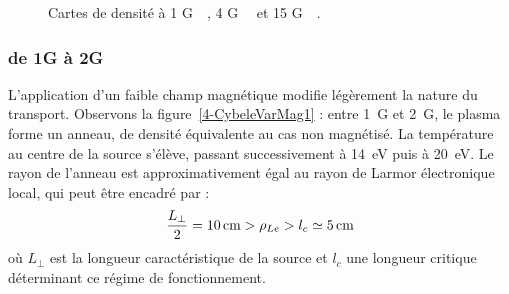 \begin{refsection}
\begin{figure}[!htb]
  \centering
    \caption{Cartes de densité à 1 G~~, 4
    G~~ et 15 G~~.}
    \label{4-CybeleVarMag-1}
\end{figure}

\subsubsection{de 1G à 2G}

L'application d'un faible champ magnétique modifie légèrement la nature du
transport. Observons la figure~\ref{4-CybeleVarMag1} : entre 1~G et 2~G, le
plasma forme un anneau, de densité équivalente au cas non
magnétisé. La température au centre de la source s'élève, passant 
successivement à 14~eV puis à 20~eV. Le rayon de l'anneau est approximativement
égal au rayon de Larmor électronique local, qui peut être encadré par :
\begin{equation}
\frac{L_\perp}{2}=10\,\text{cm}>\rho{_{Le}}>l_c\simeq 5\,\text{cm}
\end{equation}
où $L_\perp$ est la longueur caractéristique de la source et $l_c$ une longueur
critique déterminant ce régime de fonctionnement. 


\end{refsection}
